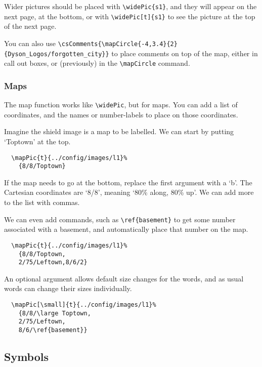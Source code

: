 \documentclass[a4paper,openany]{book}
\begin{document}
\begin{multicols}{2}
Wider pictures should be placed with \verb"\widePic{s1}", and they will appear on the next page, at the bottom, or with \verb"\widePic[t]{s1}" to see the picture at the top of the next page.


You can also use \verb"\csComments{\mapCircle{-4,3.4}{2}{Dyson_Logos/forgotten_city}}" to place comments on top of the map, either in call out boxes, or (previously) in the \verb"\mapCircle" command.

\subsubsection{Maps}

The map function works like \verb"\widePic", but for maps.
You can add a list of coordinates, and the names or number-labels to place on those coordinates.


Imagine the shield image is a map to be labelled.
We can start by putting `Toptown' at the top.

\begin{verbatim}
  \mapPic{t}{../config/images/l1}%
    {8/8/Toptown}
\end{verbatim}

If the map needs to go at the bottom, replace the first argument with a `b'.
The Cartesian coordinates are `8/8', meaning `80\% along, 80\% up'.
We can add more to the list with commas.

We can even add commands, such as \verb"\ref{basement}" to get some number associated with a basement, and automatically place that number on the map.

\begin{verbatim}
  \mapPic{t}{../config/images/l1}%
    {8/8/Toptown,
    2/75/Leftown,8/6/2}
\end{verbatim}

An optional argument allows default size changes for the words, and as usual words can change their sizes individually.

\begin{verbatim}
  \mapPic[\small]{t}{../config/images/l1}%
    {8/8/\large Toptown,
    2/75/Leftown,
    8/6/\ref{basement}}
\end{verbatim}

\subsection{Symbols}


\end{multicols}
\end{document}
